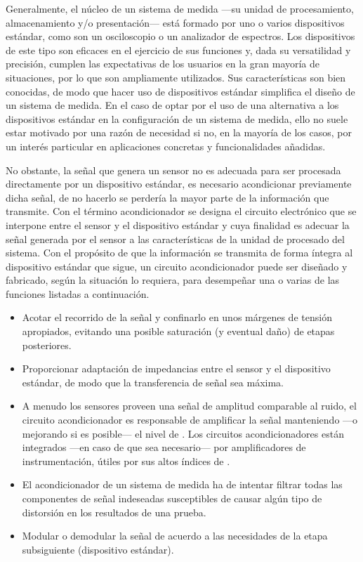Generalmente, el núcleo de un sistema de medida ---su unidad de
procesamiento, almacenamiento y/o presentación--- está formado por uno o
varios dispositivos estándar, como son un osciloscopio o un analizador de
espectros. Los dispositivos de este tipo son eficaces en el ejercicio de
sus funciones y, dada su versatilidad y precisión, cumplen las expectativas
de los usuarios en la gran mayoría de situaciones, por lo que son
ampliamente utilizados. Sus características son bien conocidas, de modo que
hacer uso de dispositivos estándar simplifica el diseño de un sistema de
medida. En el caso de optar por el uso de una alternativa a los
dispositivos estándar en la configuración de un sistema de medida, ello no
suele estar motivado por una razón de necesidad si no, en la mayoría de los
casos, por un interés particular en aplicaciones concretas y
funcionalidades añadidas.

No obstante, la señal que genera un sensor no es adecuada para ser
procesada directamente por un dispositivo estándar, es necesario
acondicionar previamente dicha señal, de no hacerlo se perdería la mayor
parte de la información que transmite. Con el término acondicionador se
designa el circuito electrónico que se interpone entre el sensor y el
dispositivo estándar y cuya finalidad es adecuar la señal generada por el
sensor a las características de la unidad de procesado del sistema. Con el
propósito de que la información se transmita de forma íntegra al
dispositivo estándar que sigue, un circuito acondicionador puede ser
diseñado y fabricado, según la situación lo requiera, para desempeñar una o
varias de las funciones listadas a continuación.

\begin{itemize}
	\item Acotar el recorrido de la señal y confinarlo en unos márgenes
		de tensión apropiados, evitando una posible saturación (y
		eventual daño) de etapas posteriores.
	\item Proporcionar adaptación de impedancias entre el sensor y el
		dispositivo estándar, de modo que la transferencia de señal
		sea máxima.
	\item A menudo los sensores proveen una señal de amplitud
		comparable al ruido, el circuito acondicionador es
		responsable de amplificar la señal manteniendo ---o
		mejorando si es posible--- el nivel de . Los
		circuitos acondicionadores están integrados ---en caso de
		que sea necesario--- por amplificadores de instrumentación,
		útiles por sus altos índices de .
	\item El acondicionador de un sistema de medida ha de intentar
		filtrar todas las componentes de señal indeseadas
		susceptibles de causar algún tipo de distorsión en los
		resultados de una prueba.
	\item Modular o demodular la señal de acuerdo a las necesidades de
		la etapa subsiguiente (dispositivo estándar).
\end{itemize}


